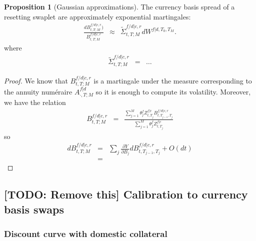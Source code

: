\documentclass[11pt,english]{amsart}
\theoremstyle{definition}
\newtheorem{prop}{Proposition}
\begin{document}
\begin{prop}[Gaussian approximations]
The currency basis spread of a resetting swaplet are approximately exponential martingales:
\begin{eqnarray}
	\frac{dB^{f/d|c,r}_{t,T;M})}{B^{f/d|c,r}_{t,T;M}}  &\approx& 
	\widetilde{\Sigma}^{f/d|c,r}_{t,T;M} dW^{f|d,T_0,T_M} .
\end{eqnarray} 
where 
\begin{eqnarray}
	\widetilde{\Sigma}^{f/d|c,r}_{t,T;M}  & = &  \ldots
\end{eqnarray} 
\end{prop}

\begin{proof}
We know that  $B^{f/d|c,r}_{t,T;M}$ is a martingale under the measure corresponding to the annuity num\'eraire $A^{f|d}_{\cdot,T;M}$ so it is enough to compute its volatility. Moreover, we have the relation 
\begin{eqnarray*}
	B^{f/d|c,r}_{t,T;M}  &=& \frac{\sum_{j=1}^{M} \theta^f_j  Z^{f|c}_{t,T_j} B^{f/d|c,r}_{t,T_{j-1},T_j}}{\sum_{j=1}^{M} \theta^f_j Z^{f|c}_{t,T_j}}
\end{eqnarray*}
so
\begin{eqnarray*}
	dB^{f/d|c,r}_{t,T;M}  &=& \sum_{j} \frac{\partial Y}{\partial B_j} d B^{f/d|c,r}_{t,T_{j-1},T_j} + O(dt) \\
	&=& 
\end{eqnarray*}
\end{proof}



\subsection{[TODO: Remove this] Calibration to currency basis swaps}


\subsubsection{Discount curve with domestic collateral}
\end{document}

